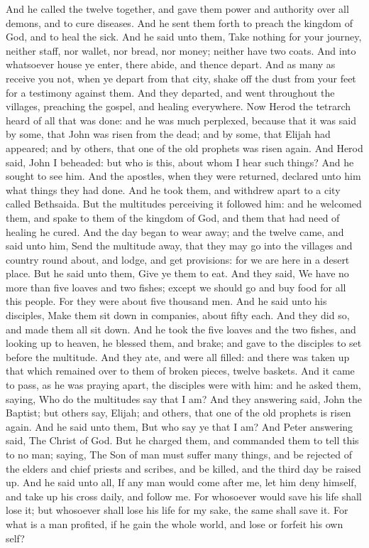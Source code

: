 And he called the twelve together, and gave them power and authority over all demons, and to cure diseases. And he sent them forth to preach the kingdom of God, and to heal the sick. And he said unto them, Take nothing for your journey, neither staff, nor wallet, nor bread, nor money; neither have two coats. And into whatsoever house ye enter, there abide, and thence depart. And as many as receive you not, when ye depart from that city, shake off the dust from your feet for a testimony against them. And they departed, and went throughout the villages, preaching the gospel, and healing everywhere.  Now Herod the tetrarch heard of all that was done: and he was much perplexed, because that it was said by some, that John was risen from the dead; and by some, that Elijah had appeared; and by others, that one of the old prophets was risen again. And Herod said, John I beheaded: but who is this, about whom I hear such things? And he sought to see him.  And the apostles, when they were returned, declared unto him what things they had done. And he took them, and withdrew apart to a city called Bethsaida. But the multitudes perceiving it followed him: and he welcomed them, and spake to them of the kingdom of God, and them that had need of healing he cured. And the day began to wear away; and the twelve came, and said unto him, Send the multitude away, that they may go into the villages and country round about, and lodge, and get provisions: for we are here in a desert place. But he said unto them, Give ye them to eat. And they said, We have no more than five loaves and two fishes; except we should go and buy food for all this people. For they were about five thousand men. And he said unto his disciples, Make them sit down in companies, about fifty each. And they did so, and made them all sit down. And he took the five loaves and the two fishes, and looking up to heaven, he blessed them, and brake; and gave to the disciples to set before the multitude. And they ate, and were all filled: and there was taken up that which remained over to them of broken pieces, twelve baskets.  And it came to pass, as he was praying apart, the disciples were with him: and he asked them, saying, Who do the multitudes say that I am? And they answering said, John the Baptist; but others say, Elijah; and others, that one of the old prophets is risen again. And he said unto them, But who say ye that I am? And Peter answering said, The Christ of God. But he charged them, and commanded them to tell this to no man; saying, The Son of man must suffer many things, and be rejected of the elders and chief priests and scribes, and be killed, and the third day be raised up. And he said unto all, If any man would come after me, let him deny himself, and take up his cross daily, and follow me. For whosoever would save his life shall lose it; but whosoever shall lose his life for my sake, the same shall save it. For what is a man profited, if he gain the whole world, and lose or forfeit his own self? 